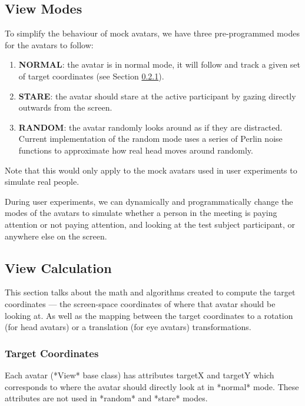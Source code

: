 \subsection{View Modes}

To simplify the behaviour of mock avatars, we have three pre-programmed modes for the avatars to follow:

\begin{enumerate}
    \item \textbf{NORMAL}: the avatar is in normal mode, it will follow and track a given set of target coordinates (see Section \ref{section:target-coord}).
    \item \textbf{STARE}: the avatar should stare at the active participant by gazing directly outwards from the screen.
    \item \textbf{RANDOM}: the avatar randomly looks around as if they are distracted. Current implementation of the random mode uses a series of Perlin noise functions to approximate how real head moves around randomly.
\end{enumerate}

Note that this would only apply to the mock avatars used in user experiments to simulate real people.

During user experiments, we can dynamically and programmatically change the modes of the avatars to simulate whether a person in the meeting is paying attention or not paying attention, and looking at the test subject participant, or anywhere else on the screen.


\subsection{View Calculation}

This section talks about the math and algorithms created to compute the target coordinates --- the screen-space coordinates of where that avatar should be looking at. As well as the mapping between the target coordinates to a rotation (for head avatars) or a translation (for eye avatars) transformations.

\subsubsection{Target Coordinates}\label{section:target-coord}

Each avatar (*View* base class) has attributes targetX and targetY which corresponds to where the avatar should directly look at in *normal* mode. These attributes are not used in *random* and *stare* modes.


